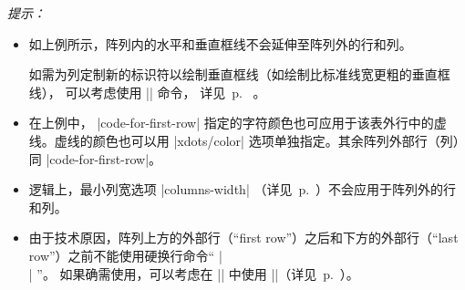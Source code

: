 \documentclass[dvipsnames]{article}%
\begin{document}
\emph{提示：}
\begin{itemize}[beginpenalty=10000]
\item 如上例所示，阵列内的水平和垂直框线不会延伸至阵列外的行和列。

如需为列定制新的标识符以绘制垂直框线（如绘制比标准线宽更粗的垂直框线），
可以考虑使用 |\OnlyMainNiceMatrix| 命令，
详见~p.~\pageref{OnlyMainNiceMatrix} 。

\item 在上例中， |code-for-first-row| 指定的字符颜色也可应用于该表外行中的虚线。虚线的颜色也可以用 |xdots/color| 选项单独指定。其余阵列外部行（列）同 |code-for-first-row|。

\item 逻辑上，最小列宽选项 |columns-width| （详见~p.~\pageref{width}）不会应用于阵列外的行和列。

\item 由于技术原因，阵列上方的外部行（``first row''）之后和下方的外部行（``last row''）之前不能使用硬换行命令“ |\\| ”。
如果确需使用，可以考虑在 |\CodeAfter| 中使用  |\SubMatrix|（详见~p.~\pageref{sub-matrix}）。
\end{itemize}

\end{document}
